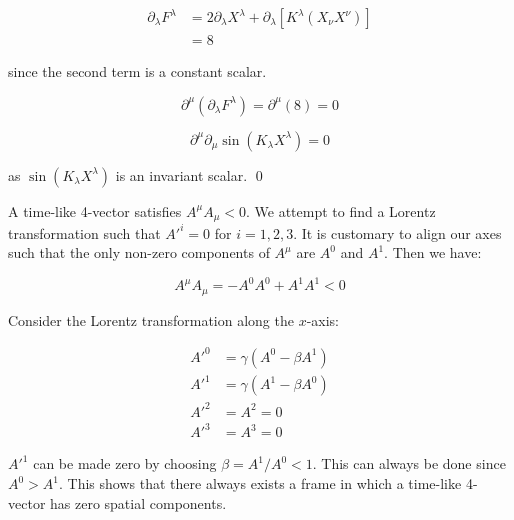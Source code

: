 \documentclass[12pt]{article}
\begin{document}
\begin{equation}
    \begin{split}
        \partial_{\lambda} F^{\lambda} &= 2\partial_{\lambda} X^{\lambda} + \partial_{\lambda} \left[ K^{\lambda} (X_{\nu} X^{\nu}) \right] \\
        &= 8
    \end{split}
\end{equation}

since the second term is a constant scalar.

\begin{equation}
    \partial^{\mu} (\partial_{\lambda} F^{\lambda}) = \partial^{\mu} (8) = 0
\end{equation}

\begin{equation}
    \partial^{\mu} \partial_{\mu} \sin{(K_{\lambda} X^{\lambda})} = 0
\end{equation}

as $\sin{(K_{\lambda} X^{\lambda})}$ is an invariant scalar.
\qed



A time-like 4-vector satisfies $A^{\mu} A_{\mu} < 0$. We attempt to find a Lorentz transformation such that $A'^{i} = 0$ for $i = 1, 2, 3$. It is customary to align our axes such that the only non-zero components of $A^{\mu}$ are $A^{0}$ and $A^{1}$. Then we have:

\begin{equation}
    A^{\mu} A_{\mu} = -A^{0} A^{0} + A^{1} A^{1} < 0
\end{equation}

Consider the Lorentz transformation along the $x$-axis:

\begin{equation}
    \begin{split}
        A'^{0} &= \gamma (A^{0} - \beta A^{1}) \\
        A'^{1} &= \gamma (A^{1} - \beta A^{0}) \\
        A'^{2} &= A^{2} = 0 \\
        A'^{3} &= A^{3} = 0
    \end{split}
\end{equation}

$A'^{1}$ can be made zero by choosing $\beta = A^{1}/A^{0} < 1$. This can always be done since $A^{0} > A^{1}$. This shows that there always exists a frame in which a time-like 4-vector has zero spatial components.
\end{document}
